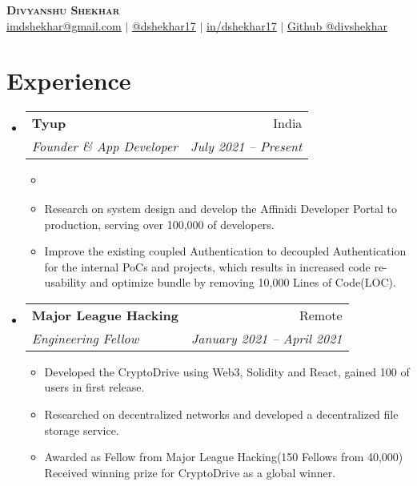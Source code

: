 \documentclass[letterpaper,11pt]{article}
\makeatletter
\newcommand{\resumeItem}[1]{
  \item\small{
    {#1 \vspace{-2pt}}
  }
}
\newcommand{\resumeSubheading}[4]{
  \vspace{-2pt}\item
    \begin{tabular*}{0.97\textwidth}[t]{l@{\extracolsep{\fill}}r}
      \textbf{#1} & #2 \\
      \textit{\small#3} & \textit{\small #4} \\
    \end{tabular*}\vspace{-7pt}
}
\newcommand{\resumeSubSubheading}[2]{
    \item
    \begin{tabular*}{0.97\textwidth}{l@{\extracolsep{\fill}}r}
      \textit{\small#1} & \textit{\small #2} \\
    \end{tabular*}\vspace{-7pt}
}
\newcommand{\resumeSubHeadingListStart}{\begin{itemize}[leftmargin=0.15in, label={}]}
\newcommand{\resumeSubHeadingListEnd}{\end{itemize}}
\newcommand{\resumeItemListStart}{\begin{itemize}}
\newcommand{\resumeItemListEnd}{\end{itemize}\vspace{-5pt}}
\makeatother
\begin{document}

\begin{center}
    \textbf{\Huge \scshape Divyanshu Shekhar} \\ \vspace{1pt}
    \href{mailto:imdshekhar@gmail.com}{\underline{imdshekhar@gmail.com}} $|$ 
    \href{https://twitter.com/dshekhar17}{\underline{@dshekhar17}} $|$ 
    \href{https://linkedin.com/in/dshekhar17}{\underline{in/dshekhar17}} $|$
    \href{https://github.com/divshekhar}{\underline{Github @divshekhar}}
    
\end{center}


\section{Experience}
  \resumeSubHeadingListStart
    \resumeSubheading
      {Tyup}{India}
      {Founder \& App Developer}{July 2021 -- Present}
      \resumeItemListStart
        \resumeItem{}
        \resumeItem{Research on system design and develop the Affinidi Developer Portal to production, serving over 100,000 of developers.}
        \resumeItem{Improve the existing coupled Authentication to decoupled Authentication for the internal PoCs and projects, which results in increased code re-usability and optimize bundle by removing 10,000 Lines of Code(LOC). }
        
    
      \resumeItemListEnd
    \resumeSubheading
      {Major League Hacking}{Remote}
      {Engineering Fellow}{January 2021 -- April 2021}
      \resumeItemListStart
        \resumeItem{Developed the CryptoDrive using Web3, Solidity and React, gained 100 of users in first release.}
        \resumeItem{Researched on decentralized networks and developed a decentralized file storage service. }
        \resumeItem{Awarded as Fellow from Major League Hacking(150 Fellows from 40,000) Received winning prize for CryptoDrive as a global winner.}
       
     \resumeItemListEnd


  \resumeSubHeadingListEnd
\end{document}

